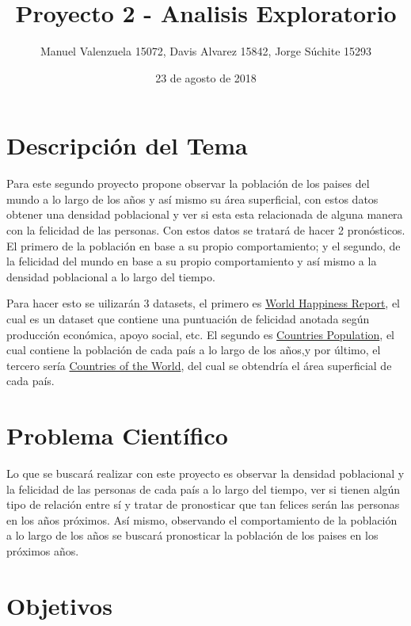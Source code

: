 \documentclass[]{article}
\title{Proyecto 2 - Analisis Exploratorio}
\author{Manuel Valenzuela 15072, Davis Alvarez 15842, Jorge Súchite 15293}
\date{23 de agosto de 2018}
\begin{document}
\maketitle

\section{Descripción del Tema}\label{descripcion-del-tema}

Para este segundo proyecto propone observar la población de los paises
del mundo a lo largo de los años y así mismo su área superficial, con
estos datos obtener una densidad poblacional y ver si esta esta
relacionada de alguna manera con la felicidad de las personas. Con estos
datos se tratará de hacer 2 pronósticos. El primero de la población en
base a su propio comportamiento; y el segundo, de la felicidad del mundo
en base a su propio comportamiento y así mismo a la densidad poblacional
a lo largo del tiempo.

Para hacer esto se uilizarán 3 datasets, el primero es
\href{https://www.kaggle.com/unsdsn/world-happiness/home}{World Happiness Report},
el cual es un dataset que contiene una puntuación de felicidad anotada
según producción económica, apoyo social, etc. El segundo es
\href{https://www.kaggle.com/centurion1986/countries-population}{Countries Population},
el cual contiene la población de cada país a lo largo de los años,y por
último, el tercero sería
\href{https://www.kaggle.com/fernandol/countries-of-the-world}{Countries of the World},
del cual se obtendría el área superficial de cada país.

\section{Problema Científico}\label{problema-cientifico}

Lo que se buscará realizar con este proyecto es observar la densidad
poblacional y la felicidad de las personas de cada país a lo largo del
tiempo, ver si tienen algún tipo de relación entre sí y tratar de
pronosticar que tan felices serán las personas en los años próximos. Así
mismo, observando el comportamiento de la población a lo largo de los
años se buscará pronosticar la población de los paises en los próximos
años.

\section{Objetivos}\label{objetivos}
\end{document}

